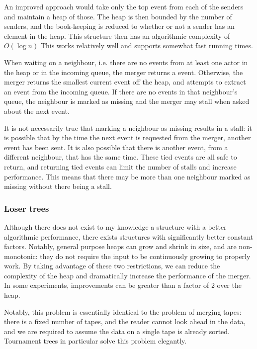 An improved approach would take only the top event from each of the senders and maintain a heap of those.
The heap is then bounded by the number of senders, and the book-keeping is reduced to whether or not a sender has an element in the heap.
This structure then has an algorithmic complexity of $O\left(\log n\right)$
This works relatively well and supports somewhat fast running times. %

When waiting on a neighbour, i.e. there are no events from at least one actor in the heap or in the incoming queue, the merger returns a  event.
Otherwise, the merger returns the smallest current event off the heap, and attempts to extract an event from the incoming queue.
If there are no events in that neighbour's queue, the neighbour is marked as missing and the merger may stall when asked about the next event.

It is not necessarily true that marking a neighbour as missing results in a stall: it is possible that by the time the next event is requested from the merger, another event has been sent.
It is also possible that there is another event, from a different neighbour, that has the same time.
These tied events are all safe to return, and returning tied events can limit the number of stalls and increase performance.
This means that there may be more than one neighbour marked as missing without there being a stall.

\subsubsection{Loser trees}

Although there does not exist to my knowledge a structure with a better algorithmic performance, there exists structures with significantly better constant factors.
Notably, general purpose heaps can grow and shrink in size, and are non-monotonic: they do not require the input to be continuously growing to properly work.
By taking advantage of these two restrictions, we can reduce the complexity of the heap and dramatically increase the performance of the merger.
In some experiments, improvements can be greater than a factor of 2 over the heap.

Notably, this problem is essentially identical to the problem of merging tapes: there is a fixed number of tapes, and the reader cannot look ahead in the data, and we are required to assume the data on a single tape is already sorted.
Tournament trees in particular solve this problem elegantly.

